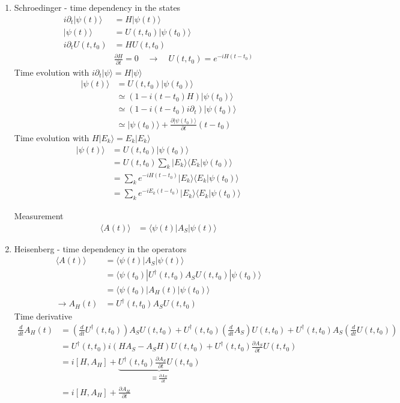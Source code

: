 \documentclass[../main.tex]{subfiles}
\begin{document}
\begin{enumerate}
\item Schroedinger - time dependency in the states
\begin{align}
i\partial_t|\psi(t)\rangle&=H|\psi(t)\rangle\\
|\psi(t)\rangle&=U(t,t_0)|\psi(t_0)\rangle\\
i\partial_t U(t,t_0)&=HU(t,t_0)\\
&\frac{\partial H}{\partial t}=0\quad\rightarrow\quad U(t,t_0)=e^{-iH(t-t_0)}
\end{align}
Time evolution with $i\partial_t |\psi\rangle=H|\psi\rangle$
\begin{align}
|\psi(t)\rangle
&=U(t,t_0)|\psi(t_0)\rangle\\
&\simeq(1-i(t-t_0)H)|\psi(t_0)\rangle\\
&\simeq(1-i(t-t_0)i\partial_t)|\psi(t_0)\rangle\\
&\simeq|\psi(t_0)\rangle+\frac{\partial |\psi(t_0)\rangle}{\partial t}(t-t_0)
\end{align}
Time evolution with $H|E_k\rangle=E_k|E_k\rangle$
\begin{align}
|\psi(t)\rangle
&=U(t,t_0)|\psi(t_0)\rangle\\
&=U(t,t_0)\sum_k |E_k\rangle\langle E_k|\psi(t_0)\rangle\\
&=\sum_k e^{-iH(t-t_0)}|E_k\rangle\langle E_k|\psi(t_0)\rangle\\
&=\sum_k e^{-iE_k(t-t_0)}|E_k\rangle\langle E_k|\psi(t_0)\rangle
\end{align}

Measurement
\begin{align}
\langle A(t)\rangle&=\langle\psi(t)|A_S|\psi(t)\rangle
\end{align}

\item Heisenberg - time dependency in the operators
\begin{align}
\langle A(t)\rangle
&=\langle\psi(t)|A_S|\psi(t)\rangle\\
&=\langle\psi(t_0)|U^\dagger(t,t_0)A_SU(t,t_0)|\psi(t_0)\rangle\\
&=\langle\psi(t_0)|A_H(t)|\psi(t_0)\rangle\\
\rightarrow A_H(t)&=U^\dagger(t,t_0)A_SU(t,t_0)
\end{align}
Time derivative
\begin{align}
\frac{d}{dt}A_H(t)
&=\left(\frac{d}{dt}U^\dagger(t,t_0)\right) A_SU(t,t_0)
+U^\dagger(t,t_0) \left(\frac{d}{dt}A_S\right)U(t,t_0)
+U^\dagger(t,t_0) A_S\left(\frac{d}{dt}U(t,t_0)\right)\\
&=U^\dagger(t,t_0)i(HA_S-A_SH)U(t,t_0)+U^\dagger(t,t_0)\frac{\partial A_S}{\partial t}U(t,t_0)\\
&=i[H,A_H]+\underbrace{U^\dagger(t,t_0)\frac{\partial A_S}{\partial t}U(t,t_0)}_{\equiv\frac{\partial A_H}{\partial t}}\\
&=i[H,A_H]+\frac{\partial A_H}{\partial t}
\end{align}


\end{enumerate}
\end{document}
